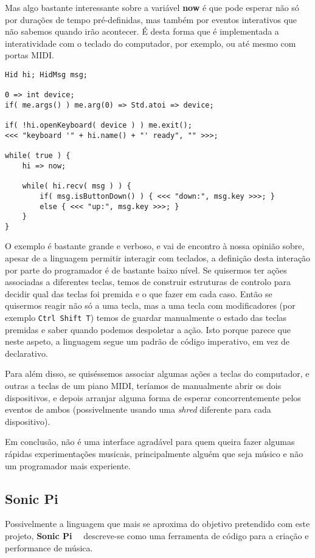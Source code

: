 Mas algo bastante interessante sobre a variável \textbf{now} é que pode esperar não só por durações de tempo pré-definidas, mas também por eventos interativos que não sabemos quando irão acontecer. É desta forma que é implementada a interatividade com o teclado do computador, por exemplo, ou até mesmo com portas MIDI.

\begin{lstlisting}[caption={Exemplos de instruções de avanço no tempo},label={lst:chuck-5}]
Hid hi; HidMsg msg;

0 => int device;
if( me.args() ) me.arg(0) => Std.atoi => device;

if( !hi.openKeyboard( device ) ) me.exit();
<<< "keyboard '" + hi.name() + "' ready", "" >>>;

while( true ) {
    hi => now;

    while( hi.recv( msg ) ) {
        if( msg.isButtonDown() ) { <<< "down:", msg.key >>>; } 
        else { <<< "up:", msg.key >>>; }
    }
}
\end{lstlisting}

O exemplo é bastante grande e verboso, e vai de encontro à nossa opinião sobre, apesar de a linguagem permitir interagir com teclados, a definição desta interação por parte do programador é de bastante baixo nível. Se quisermos ter ações associadas a diferentes teclas, temos de construir estruturas de controlo para decidir qual das teclas foi premida e o que fazer em cada caso. Então se quisermos reagir não só a uma tecla, mas a uma tecla com modificadores (por exemplo \texttt{Ctrl Shift T}) temos de guardar manualmente o estado das teclas premidas e saber quando podemos despoletar a ação. Isto porque parece que neste aspeto, a linguagem segue um padrão de código imperativo, em vez de declarativo.

Para além disso, se quiséssemos associar algumas ações a teclas do computador, e outras a teclas de um piano MIDI, teríamos de manualmente abrir os dois dispositivos, e depois arranjar alguma forma de esperar concorrentemente pelos eventos de ambos (possivelmente usando uma \textit{shred} diferente para cada dispositivo).

Em conclusão, não é uma interface agradável para quem queira fazer algumas rápidas experimentações musicais, principalmente alguém que seja músico e não um programador mais experiente.

\subsection{Sonic Pi}
Possivelmente a linguagem que mais se aproxima do objetivo pretendido com este projeto, \textbf{Sonic Pi}~\cite{doi:SonicPi}~\cite{sonic-pi} descreve-se como uma ferramenta de código para a criação e performance de música.

